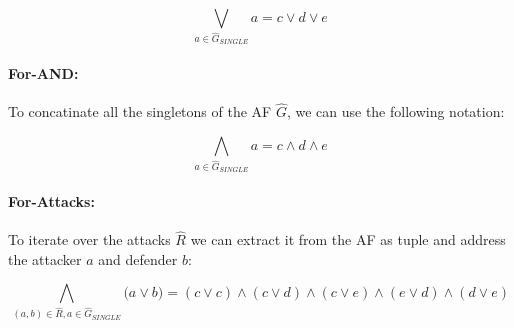 $$
\bigvee_{a \in \hat{G}_{\!S\!I\!N\!G\!L\!E}} a = c \lor d \lor e
$$

\paragraph{For-AND:} To concatinate all the singletons of the AF $\hat{G}$, we can use the following notation:

$$
\bigwedge_{a \in \hat{G}_{\!S\!I\!N\!G\!L\!E}} a = c \land d \land e
$$

\paragraph{For-Attacks: } To iterate over the attacks $\hat{R}$ we can extract it from the AF as tuple and address the attacker $a$ and defender $b$:

$$
\bigwedge_{(a, b) \in \hat{R}, a\in \hat{G}_{\!S\!I\!N\!G\!L\!E}} \big( a \lor b \big) = (c \lor c) \land
(c \lor d) \land (c \lor e) \land (e \lor d) \land (d \lor e)
$$

